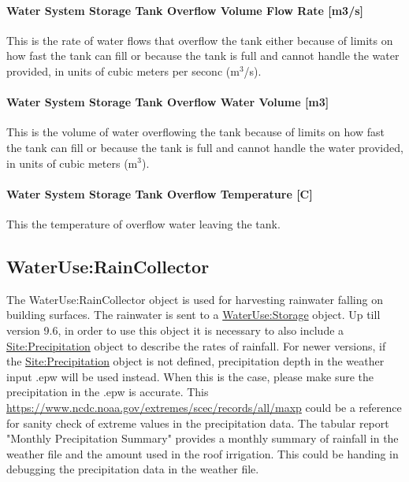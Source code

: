 \paragraph{Water System Storage Tank Overflow Volume Flow Rate {[}m3/s{]}}\label{water-system-storage-tank-overflow-volume-flow-rate-m3s}

This is the rate of water flows that overflow the tank either because of limits on how fast the tank can fill or because the tank is full and cannot handle the water provided, in units of cubic meters per seconc (m\(^{3}\)/s).

\paragraph{Water System Storage Tank Overflow Water Volume {[}m3{]}}\label{water-system-storage-tank-overflow-water-volume-m3}

This is the volume of water overflowing the tank because of limits on how fast the tank can fill or because the tank is full and cannot handle the water provided, in units of cubic meters (m\(^{3}\)).

\paragraph{Water System Storage Tank Overflow Temperature {[}C{]}}\label{water-system-storage-tank-overflow-temperature-c}

This the temperature of overflow water leaving the tank.

\subsection{WaterUse:RainCollector}\label{wateruseraincollector}

The WaterUse:RainCollector object is used for harvesting rainwater falling on building surfaces. The rainwater is sent to a \hyperref[waterusestorage]{WaterUse:Storage} object. Up till version 9.6, in order to use this object it is necessary to also include a \hyperref[siteprecipitation]{Site:Precipitation} object to describe the rates of rainfall. For newer versions, if the \hyperref[siteprecipitation]{Site:Precipitation} object is not defined, precipitation depth in the weather input .epw will be used instead. When this is the case, please make sure the precipitation in the .epw is accurate. This \hyperref[table by the State Climate Extreme Committee]{https://www.ncdc.noaa.gov/extremes/scec/records/all/maxp} could be a reference for sanity check of extreme values in the precipitation data. The tabular report "Monthly Precipitation Summary" provides a monthly summary of rainfall in the weather file and the amount used in the roof irrigation. This could be handing in debugging the precipitation data in the weather file.

